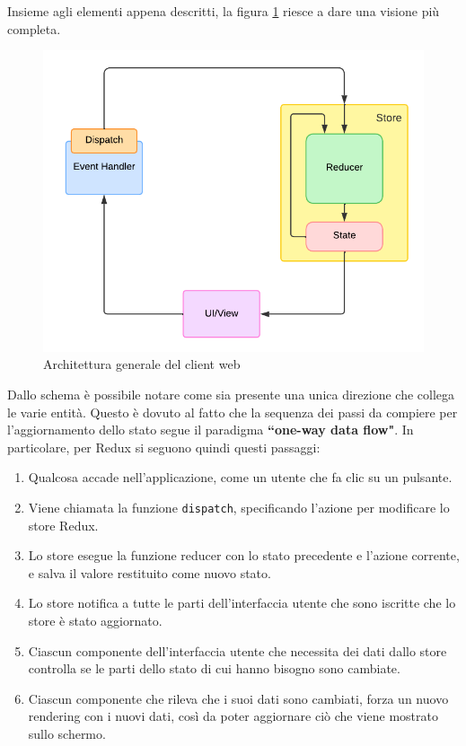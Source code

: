 Insieme agli elementi appena descritti, la figura \cref{fig:redux-scheme} riesce a dare una visione più completa.
\begin{figure}[htb]
	\centering
	\includegraphics[scale=0.8]{imgs/Redux_Scheme.pdf}
	\caption{Architettura generale del client web}
	\label{fig:redux-scheme}
\end{figure}
Dallo schema è possibile notare come sia presente una unica direzione che collega le varie entità. Questo è dovuto al fatto che la sequenza dei passi da compiere per l'aggiornamento dello stato segue il paradigma \textbf{``one-way data flow"}. In particolare, per Redux si seguono quindi questi passaggi:
\begin{enumerate}	
	\item Qualcosa accade nell'applicazione, come un utente che fa clic su un pulsante.
	\item Viene chiamata la funzione \texttt{dispatch}, specificando l'azione per modificare lo store Redux.
	\item Lo store esegue la funzione reducer con lo stato precedente e l'azione corrente, e salva il valore restituito come nuovo stato.
	\item Lo store notifica a tutte le parti dell'interfaccia utente che sono iscritte che lo store è stato aggiornato.
	\item Ciascun componente dell'interfaccia utente che necessita dei dati dallo store controlla se le parti dello stato di cui hanno bisogno sono cambiate.
	\item Ciascun componente che rileva che i suoi dati sono cambiati, forza un nuovo rendering con i nuovi dati, così da poter aggiornare ciò che viene mostrato sullo schermo.
\end{enumerate}
